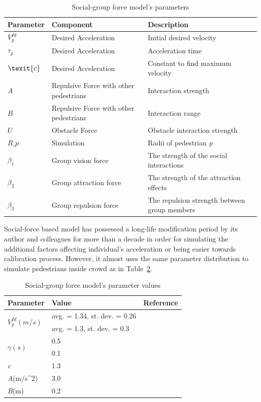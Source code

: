 \documentclass[a4paper,11pt,phdthesis,singlespace,twoside]{cssethesis}
\begin{document}
\begin{table}[H]
\caption{Social-group force model's parameters}
\begin{tabular}{|l|l|l|} \hline
\textbf{Parameter} & \textbf{Component} & \textbf{Description} \\ \hline
$ V_{p}^{Id}$ &Desired Acceleration& Initial desired velocity \\ \hline
$ \tau_{p}$ &Desired Acceleration& Acceleration time \\ \hline
$\texit{c}$ &Desired Acceleration& Constant to find maximum velocity  \\ \hline
$ \textit{A}$ & Repulsive Force with other pedestrians& Interaction strength \\ \hline
$ \textit{B}$ & Repulsive Force with other pedestrians& Interaction range \\ \hline
$ \textit{U}$ & Obstacle Force & Obstacle interaction strength  \\ \hline 
$ \textit{R_{p}}$ &  Simulation & Radii of pedestrian \textit{p}\\ \hline 
$ \beta_{1}$ &  Group vision force & The strength of the social interactions\\ \hline 
$ \beta_{2}$ &  Group attraction force & The strength of the attraction effects \\ \hline 
$ \beta_{3}$ &  Group repulsion force & The repulsion strength between group members\\ \hline 
\end{tabular}
\label{tab:model_params}
\end{table}
Social-force based model has possessed a long-life modification period by its author and colleagues for more than a decade in order for simulating the additional factors affecting individual's acceleration or being easier towards calibration process. However, it almost uses the same parameter distribution to simulate pedestrians inside crowd as in Table~\ref{tab:model_params_values}.
\begin{table}[H]
\caption{Social-group force model's parameter values}
\begin{center}
\begin{tabular}{|l|l|l|} \hline
\textbf{Parameter} & \textbf{Value} & \textbf{Reference} \\ \hline
\multirow{2}{*}{$ V_{p}^{Id}(m/s)$}& avg. = 1.34, st. dev. = 0.26 & \cite{Helbing1995}\\ 
															& avg. = 1.3, st. dev. = 0.3 & \cite{Helbing2005} \\ \hline
\multirow{2}{*}{$ \gamma(s)$}& 0.5 & \cite{Helbing1995}\\ 
															& 0.1 & \cite{Helbing2000} \cite{Helbing2005}\\ \hline
\textit{c}&1.3&\cite{Helbing1995} \cite{Helbing2000} \\ \hline
\textit{A}(m/s^{2})&3.0 &\cite{Helbing2005}\\ \hline
\textit{B}(m)&0.2&\cite{Helbing2005}\\ \hline	 																										
\end{tabular}
\end{center}
\label{tab:model_params_values}
\end{table}
\end{document}
